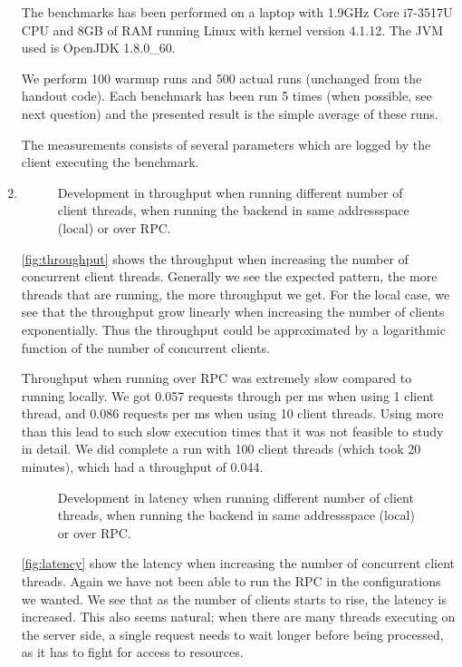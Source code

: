 \documentclass[11pt,a4paper,english]{article}
\begin{document}
\begin{enumerate}
  The benchmarks has been performed on a laptop with 1.9GHz Core i7-3517U CPU and
  8GB of RAM running Linux with kernel version 4.1.12. The JVM used is OpenJDK
  1.8.0\_60.

  We perform 100 warmup runs and 500 actual runs (unchanged from the handout
  code). Each benchmark has been run 5 times (when possible, see next question)
  and the presented result is the simple average of these runs.

  The measurements consists of several parameters which are logged by the client
  executing the benchmark.


\item


\begin{figure}[H]
  \centering
  \caption{Development in throughput when running different number of
    client threads, when running the backend in same addressspace (local) or
    over RPC.}
  \label{fig:throughput}
\end{figure}

\autoref{fig:throughput} shows the throughput when increasing the number of
concurrent client threads. Generally we see the expected pattern, the more
threads that are running, the more throughput we get. For the local case, we see
that the throughput grow linearly when increasing the number of clients
exponentially. Thus the throughput could be approximated by a logarithmic
function of the number of concurrent clients.

Throughput when running over RPC was extremely slow compared to running
locally. We got 0.057 requests through per ms when using 1 client thread, and
0.086 requests per ms when using 10 client threads. Using more than this lead to
such slow execution times that it was not feasible to study in detail. We did
complete a run with 100 client threads (which took 20 minutes), which had a
throughput of 0.044.

\begin{figure}[H]
  \centering
  \caption{Development in latency when running different number of
    client threads, when running the backend in same addressspace (local) or
    over RPC.}
  \label{fig:latency}
\end{figure}

\autoref{fig:latency} show the latency when increasing the number of concurrent
client threads. Again we have not been able to run the RPC in the configurations
we wanted. We see that as the number of clients starts to rise, the latency is
increased. This also seems natural; when there are many threads executing on the
server side, a single request needs to wait longer before being processed, as it
has to fight for access to resources.


\end{enumerate}
\end{document}
